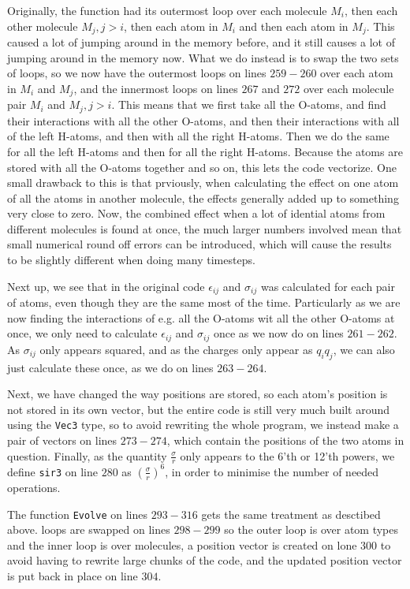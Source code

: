 \documentclass{article}
\begin{document}
Originally, the function had its outermost loop over each molecule $M_i$, then each other molecule $M_j,j>i$, then each atom in $M_i$ and then each atom in $M_j$. This caused a lot of jumping around in the memory before, and it still causes a lot of jumping around in the memory now. What we do instead is to swap the two sets of loops, so we now have the outermost loops on lines $259-260$ over each atom in $M_i$ and $M_j$, and the innermost loops on lines $267$ and $272$ over each molecule pair $M_i$ and $M_j,j>i$. This means that we first take all the O-atoms, and find their interactions with all the other O-atoms, and then their interactions with all of the left H-atoms, and then with all the right H-atoms. Then we do the same for all the left H-atoms and then for all the right H-atoms. Because the atoms are stored with all the O-atoms together and so on, this lets the code vectorize. One small drawback to this is that prviously, when calculating the effect on one atom of all the atoms in another molecule, the effects generally added up to something very close to zero. Now, the combined effect when a lot of idential atoms from different molecules is found at once, the much larger numbers involved mean that small numerical round off errors can be introduced, which will cause the results to be slightly different when doing many timesteps.

Next up, we see that in the original code $\epsilon_{ij}$ and $\sigma_{ij}$ was calculated for each pair of atoms, even though they are the same most of the time. Particularly as we are now finding the interactions of e.g. all the O-atoms wit all the other O-atoms at once, we only need to calculate $\epsilon_{ij}$ and $\sigma_{ij}$ once as we now do on lines $261-262$. As $\sigma_{ij}$ only appears squared, and as the charges only appear as $q_iq_j$, we can also just calculate these once, as we do on lines $263-264$.

Next, we have changed the way positions are stored, so each atom's position is not stored in its own vector, but the entire code is still very much built around using the \texttt{Vec3} type, so to avoid rewriting the whole program, we instead make a pair of vectors on lines $273-274$, which contain the positions of the two atoms in question. Finally, as the quantity $\frac{\sigma}{r}$ only appears to the 6'th or 12'th powers, we define \texttt{sir3} on line $280$ as $\left(\frac{\sigma}{r}\right)^6$, in order to minimise the number of needed operations.

The function \texttt{Evolve} on lines $293-316$ gets the same treatment as desctibed above. loops are swapped on lines $298-299$ so the outer loop is over atom types and the inner loop is over molecules, a position vector is created on lone $300$ to avoid having to rewrite large chunks of the code, and the updated position vector is put back in place on line $304$.
\end{document}
